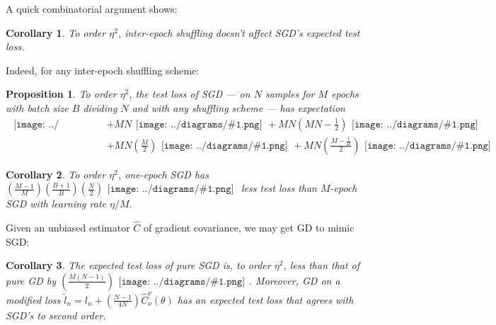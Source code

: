 \documentclass{article}
\newtheorem{cor}{Corollary}
\newtheorem{prop}{Proposition}
\newcommand{\wrap}[1]{\left( #1 \right)}
\newcommand{\mdia}[1]{\begin{gathered}\texttt{[image: ../diagrams/\#1.png]}\end{gathered}}
\newcommand{\sdia}[1]{\begin{gathered}\texttt{[image: ../diagrams/\#1.png]}\end{gathered}}
\begin{document}
    A quick combinatorial argument shows:
    \begin{cor}
        To order $\eta^2$, inter-epoch shuffling doesn't affect SGD's
        expected test loss.
    \end{cor}
    Indeed, for any inter-epoch shuffling scheme: 
    \begin{prop}\label{prop:ordtwo}
        To order $\eta^2$, the test loss of SGD --- on $N$
        samples for $M$ epochs with batch size $B$ dividing $N$ and with any
        shuffling scheme --- has expectation
        {\small
        \begin{align*}
                                                    \mdia{(0)()}
            &+ MN                                   \mdia{(0-1)(01)}
             + MN\wrap{MN - \frac{1}{2}}            \mdia{(0-1-2)(01-12)} \\
            &+ MN\wrap{\frac{M}{2}}                 \mdia{c(01-2)(02-12)}  
             + MN\wrap{\frac{M-\frac{1}{B}}{2}}     \mdia{c(01-2)(01-12)}
        \end{align*}
        }
    \end{prop}

    \begin{cor}
        To order $\eta^2$, one-epoch SGD has 
        $
             \wrap{\frac{M-1}{M}}\wrap{\frac{B+1}{B}}\wrap{\frac{N}{2}} \sdia{c(01-2)(01-12)}
        $
        less test loss than $M$-epoch SGD with learning rate $\eta/M$. 
    \end{cor}

    Given an unbiased estimator $\hat{C}$ of gradient covariance, we may get
    GD to mimic SGD:
    \begin{cor}
        The expected test loss of pure SGD is, to order $\eta^2$,
        less than that of pure GD by
        $
              \wrap{\frac{M(N-1)}{2}} \sdia{c(01-2)(01-12)}
        $.
        Moreover, GD on a modified loss 
        $
            \tilde l_n = l_n + \wrap{\frac{N-1}{4N}} \hat{C}_\nu^\nu(\theta)
        $
        has an expected test loss that agrees with SGD's to second order.
    \end{cor}
\end{document}
